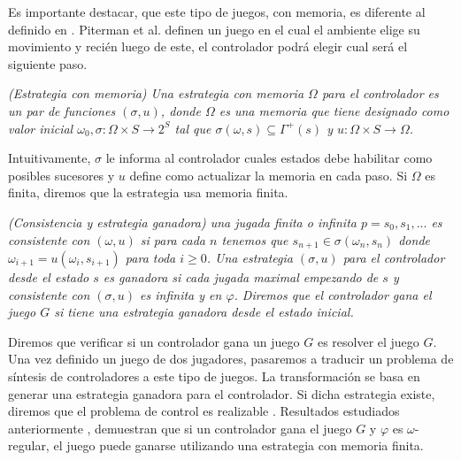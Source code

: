 Es importante destacar, que este tipo de juegos, con memoria, es diferente al definido en \cite{Piterman}. Piterman et al.
definen un juego en el cual el ambiente elige su movimiento y recién luego de este, el controlador podrá elegir cual será
el siguiente paso.

\begin{nahaDef}
    \emph{(Estrategia con memoria) Una estrategia con memoria $\Omega$ para el controlador es un par de funciones
    $(\sigma, u)$, donde $\Omega$ es una memoria que tiene designado como valor inicial $\omega_0, \sigma: \Omega \times
    S \rightarrow 2^S$ tal que $\sigma(\omega,s) \subseteq \Gamma^+(s)$ y $u: \Omega \times S \rightarrow \Omega$.}
\end{nahaDef}

Intuitivamente, $\sigma$ le informa al controlador cuales estados debe habilitar como posibles sucesores y $u$ define
como actualizar la memoria en cada paso. Si $\Omega$ es finita, diremos que la estrategia usa memoria finita.

\begin{nahaDef}
    \emph{(Consistencia y estrategia ganadora) una jugada finita o infinita $p = s_0,s_1,...$ es consistente con
    $(\omega,u)$ si para cada $n$ tenemos que $s_{n+1} \in \sigma(\omega_n,s_n)$ donde $\omega_{i+1} = u(\omega_i,s_{i+1})$ 
    para toda $i \geq 0$. Una estrategia $(\sigma, u)$ para el controlador desde el estado $s$ es
    ganadora si cada jugada maximal empezando de $s$ y consistente con $(\sigma, u)$ es infinita y en $\varphi$. Diremos
    que el controlador gana el juego $G$ si tiene una estrategia ganadora desde el estado inicial.}
\end{nahaDef}

Diremos que verificar si un controlador gana un juego $G$ es resolver el juego $G$. Una vez definido un juego de dos
jugadores, pasaremos a traducir un problema de síntesis de controladores a este tipo de juegos. La transformación se
basa en generar una estrategia ganadora para el controlador. Si dicha estrategia existe, diremos que el problema de
control es realizable \cite{MalerPS95,21072}. Resultados estudiados anteriormente \cite{Pnueli:1989:SRM:75277.75293},
demuestran que si un controlador gana el juego $G$ y $\varphi$ es $\omega$-regular, el juego puede ganarse utilizando
una estrategia con memoria finita.

